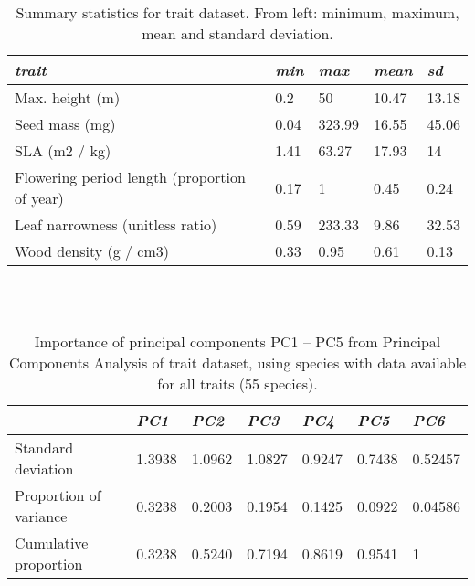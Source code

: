 \documentclass[openright,12pt,a4paper]{memoir}
\begin{document}
\begin{table}[ht]
\tiny
\centering
\caption[Summary statistics for trait dataset.]{\small{Summary statistics for trait dataset. From left: minimum, maximum, mean and standard deviation.}} \\
\label{Ch3sup2_T2} \\
{\tabulinesep=1.2mm
\begin{tabu} to 
\hline
\textit{trait} & \textit{min} & \textit{max} & \textit{mean} & \textit{sd} \\
\hline
Max. height (m) & 0.2 & 50 & 10.47 & 13.18 \\
Seed mass (mg) & 0.04 & 323.99 & 16.55 & 45.06 \\
SLA (m2 / kg) & 1.41 & 63.27 & 17.93 & 14 \\
Flowering period length \newline(proportion of year) & 0.17 & 1 & 0.45 & 0.24 \\
Leaf narrowness (unitless ratio) & 0.59 & 233.33 & 9.86 & 32.53 \\
Wood density (g / cm3) & 0.33 & 0.95 & 0.61 & 0.13 \\
\hline
\end{tabu}}
\end{table}


\begin{table}[ht]
\tiny
\centering
\caption[Importance of principal components (trait dataset, all traits).]{\small{Importance of principal components PC1 – PC5 from Principal Components Analysis of trait dataset, using species with data available for all traits (55 species).}} \\
\label{Ch3sup2_T3} \\
{\tabulinesep=1.2mm
\begin{tabu} to 
\hline
&                      \textit{PC1}  & \textit{PC2}    & \textit{PC3}    & \textit{PC4}    & \textit{PC5}    & \textit{PC6}            \\ 
\hline
Standard deviation     & 1.3938 & 1.0962 & 1.0827 & 0.9247 & 0.7438 & 0.52457 \\
Proportion of variance & 0.3238 & 0.2003 & 0.1954 & 0.1425 & 0.0922 & 0.04586 \\
Cumulative  proportion & 0.3238 & 0.5240 & 0.7194 & 0.8619 & 0.9541 & 1      \\
\hline
\end{tabu}}
\end{table}
\end{document}

